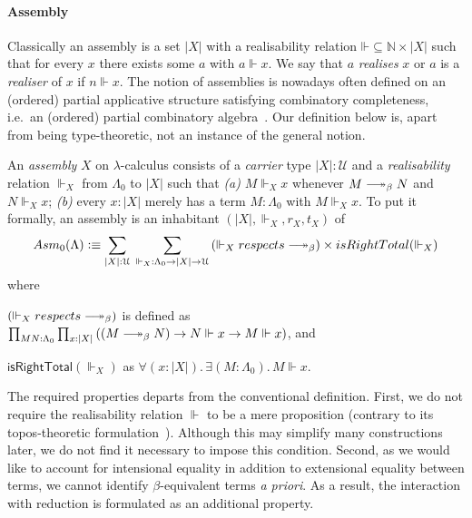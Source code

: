 \documentclass[a4paper,UKenglish,numberwithinsect,cleveref,thm-restate]{lipics-v2021}
\newcommand{\Asm}{\mathsf{Asm}}
\newcommand{\defeq}{\vcentcolon\equiv}
\newcommand{\Univ}{\mathcal{U}}
\DeclareRobustCommand\longtwoheadrightarrow{\relbar\joinrel\twoheadrightarrow}
\newcommand{\reduce}{\longtwoheadrightarrow_{\beta}}
\theoremstyle{plain}
\begin{document}
\paragraph*{Assembly}
Classically an assembly is a set $|X|$ with a realisability relation $\mathord{\Vdash} \subseteq \mathbb{N} \times |X|$ such that for every $x$ there exists some $a$ with $a \Vdash x$. We say that $a$ \emph{realises} $x$ or $a$ is a \emph{realiser} of $x$ if $n \Vdash x$.
The notion of assemblies is nowadays often defined on an (ordered) partial applicative structure satisfying combinatory completeness, i.e.\ an (ordered) partial combinatory algebra~\cite{Oosten2008}.
Our definition below is, apart from being type-theoretic, not an instance of the general notion.
\begin{definition}\label{def:assembly}
  An \emph{assembly} $X$ on $\lambda$-calculus consists of a \emph{carrier} type $|X| : \Univ$ and a \emph{realisability} relation ${\Vdash_X}$ from $\Lambda_0$ to $|X|$ such that
  \emph{(a)} $M \Vdash_X x$ whenever $M \reduce N$ and $N \Vdash_X x$;
  \emph{(b)} every $x : |X|$ merely has a term $M : \Lambda_0$ with $M \Vdash_X x$. 
  To put it formally, an assembly is an inhabitant $(|X|, \Vdash_X, r_X, t_X)$ of
  \[
    \Asm_0(\Lambda) \defeq \sum_{|X| : \Univ}\;\sum_{\mathord{\Vdash_X}:\Lambda_0 \to |X| \to \Univ} 
    \left(\mathord{\Vdash_X}\;\mathsf{respects}\;\mathord{\reduce}\right)
      \times \mathsf{isRightTotal}({\Vdash_X})
  \]
  where
  \begin{romanenumerate}
    \item $\left(\mathord{\Vdash_X}\;\mathsf{respects}\;\mathord{\reduce}\right)$ is defined as $\prod_{M N : \Lambda_0} \prod_{x : |X|} \left( \left(M \reduce N\right) \to N \Vdash x \to M \Vdash x \right) $, and 
    \item $\mathsf{isRightTotal}(\Vdash_X)$ as $\forall (x : |X|).\, \exists (M : \Lambda_0).\, M \Vdash x$.
  \end{romanenumerate}
\end{definition}
The required properties departs from the conventional definition. 
First, we do not require the realisability relation $\Vdash$ to be a mere proposition (contrary to its topos-theoretic formulation~\cite{Birkedal2002a}).
Although this may simplify many constructions later, we do not find it necessary to impose this condition.
Second, as we would like to account for intensional equality in addition to extensional equality between terms,
we cannot identify $\beta$-equivalent terms \emph{a priori}.
As a result, the interaction with reduction is formulated as an additional property. 
\end{document}
